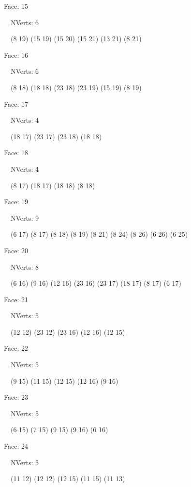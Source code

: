 \documentclass{article}
\begin{document}
{\footnotesize 

Face: 15

\   \    NVerts: 6

 \   \   (8 19) (15 19) (15 20) (15 21) (13 21) (8 21)}

{\footnotesize 

Face: 16

\   \    NVerts: 6

 \   \   (8 18) (18 18) (23 18) (23 19) (15 19) (8 19)}

{\footnotesize 

Face: 17

\   \    NVerts: 4

 \   \   (18 17) (23 17) (23 18) (18 18)}

{\footnotesize 

Face: 18

\   \    NVerts: 4

 \   \   (8 17) (18 17) (18 18) (8 18)}

{\footnotesize 

Face: 19

\   \    NVerts: 9

 \   \   (6 17) (8 17) (8 18) (8 19) (8 21) (8 24) (8 26) (6 26) (6 25)}

{\footnotesize 

Face: 20

\   \    NVerts: 8

 \   \   (6 16) (9 16) (12 16) (23 16) (23 17) (18 17) (8 17) (6 17)}

{\footnotesize 

Face: 21

\   \    NVerts: 5

 \   \   (12 12) (23 12) (23 16) (12 16) (12 15)}

{\footnotesize 

Face: 22

\   \    NVerts: 5

 \   \   (9 15) (11 15) (12 15) (12 16) (9 16)}

{\footnotesize 

Face: 23

\   \    NVerts: 5

 \   \   (6 15) (7 15) (9 15) (9 16) (6 16)}

{\footnotesize 

Face: 24

\   \    NVerts: 5

 \   \   (11 12) (12 12) (12 15) (11 15) (11 13)}
\end{document}
